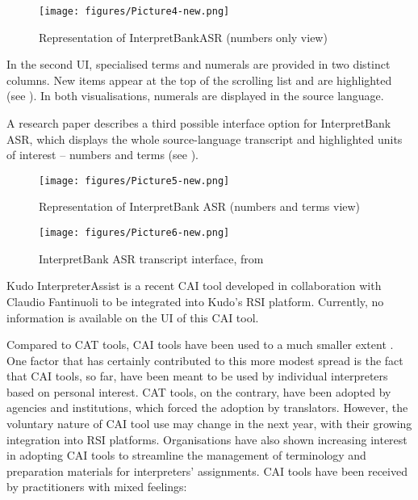 \begin{figure}
    \centering
    \texttt{[image: figures/Picture4-new.png]}
    \caption{Representation of InterpretBankASR (numbers only view)}
    \label{fig:4}
\end{figure}

In the second UI, specialised terms and numerals are provided in two distinct columns. New items appear at the top of the scrolling list and are highlighted (see ). In both visualisations, numerals are displayed in the source language.

A research paper \citep[5]{defrancq2021automatic} describes a third possible interface option for InterpretBank ASR, which displays the whole source-language transcript and highlighted units of interest -- numbers and terms (see ).

\begin{figure}
    \centering
    \texttt{[image: figures/Picture5-new.png]}
    \caption{Representation of InterpretBank ASR (numbers and terms view)}
    \label{fig:5}
\end{figure}

\begin{figure}
    \centering
    \texttt{[image: figures/Picture6-new.png]}
    \caption{InterpretBank ASR transcript interface, from \citet[7]{defrancq2021automatic}}
    \label{fig:6}
\end{figure}

Kudo InterpreterAssist \citep{fantinuoli2022kudo} is a recent CAI tool developed in collaboration with Claudio Fantinuoli to be integrated into Kudo’s RSI platform. Currently, no information is available on the UI of this CAI tool.


Compared to CAT tools, CAI tools have been used to a much smaller extent \citep[89]{tripepi2010usefulness}. One factor that has certainly contributed to this more modest spread is the fact that CAI tools, so far, have been meant to be used by individual interpreters based on personal interest. CAT tools, on the contrary, have been adopted by agencies and institutions, which forced the adoption by translators. However, the voluntary nature of CAI tool use may change in the next year, with their growing integration into RSI platforms. Organisations have also shown increasing interest in adopting CAI tools to streamline the management of terminology and preparation materials for interpreters’ assignments. CAI tools have been received by practitioners with mixed feelings:

